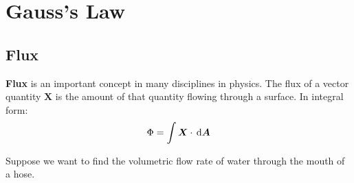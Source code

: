 \chapter{Gauss's Law}
\label{chapter:gauss}

\section{Flux}
\textbf{Flux} is an important concept in many disciplines in physics. The
flux of a vector quantity $\bm X$ is the amount of that quantity flowing
through a surface. In integral form:
\begin{equation}
  \Phi=\int\bm X\cdot\dl{\bm A}
\end{equation}

Suppose we want to find the volumetric flow rate of water through the mouth
of a hose.

